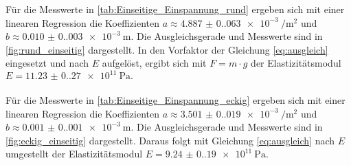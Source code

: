 Für die Messwerte in \autoref{tab:Einseitige_Einspannung_rund} ergeben sich mit einer linearen Regression die Koeffizienten $a \approx \SI{4.887(0.063)e-3}{\per\meter\squared}$ und $b \approx \SI{0.010(0.003)e-3}{\meter}$.
Die Ausgleichsgerade und Messwerte sind in \autoref{fig:rund_einseitig} dargestellt.
In den Vorfaktor der Gleichung \eqref{eq:ausgleich} eingesetzt und nach $E$ aufgelöst,
ergibt sich mit $F = m \cdot g$ der Elastizitätsmodul $E = \SI{11.23(0.27)e11}{\pascal}.$\\
\\
Für die Messwerte in \autoref{tab:Einseitige_Einspannung_eckig} ergeben sich mit einer linearen Regression die Koeffizienten $a \approx \SI{3.501(0.019)e-3}{\per\meter\squared}$ und $b \approx \SI{0.001(0.001)e-3}{\meter}$.
Die Ausgleichsgerade und Messwerte sind in \autoref{fig:eckig_einseitig} dargestellt.
Daraus folgt mit Gleichung \eqref{eq:ausgleich} nach $E$ umgestellt der Elastizitätsmodul $E = \SI{9.24(0.19)e11}{\pascal}.$


\newpage
